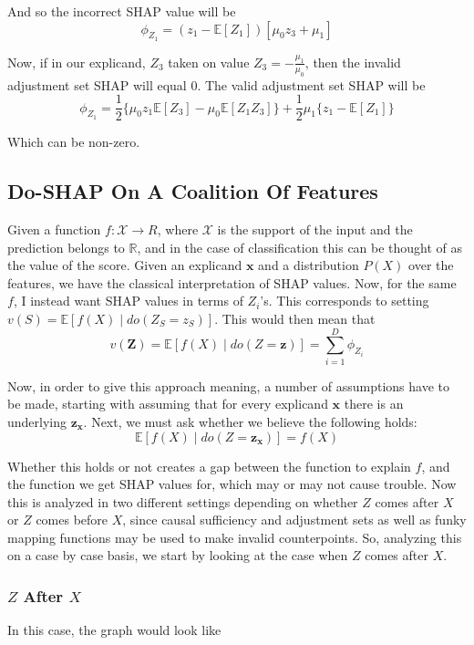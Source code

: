 \documentclass{article}
\begin{document}
And so the incorrect SHAP value will be
\[
\phi_{Z_1} = (z_1 - \mathbb{E}[Z_1])[\mu_0z_3 + \mu_1] 
\]

Now, if in our explicand, $Z_3$ taken on value $Z_3 = -\frac{\mu_1}{\mu_0}$, then the invalid adjustment set SHAP will equal $0$. The valid adjustment set SHAP will be
\[
\phi_{Z_1} = \frac{1}{2}\Big\{\mu_0z_1\mathbb{E}[Z_3] - \mu_0\mathbb{E}[Z_1Z_3] \Big\} + \frac{1}{2}\mu_1\{z_1 - \mathbb{E}[Z_1] \}
\]

Which can be non-zero.

\subsection{Do-SHAP On A Coalition Of Features}
Given a function $f: \mathcal{X} \rightarrow R$, where $\mathcal{X}$ is the support of the input and the prediction belongs to $\mathbb{R}$, and in the case of classification this can be thought of as the value of the score. Given an explicand $\mathbf{x}$ and a distribution $P(X)$ over the features, we have the classical interpretation of SHAP values. Now, for the same $f$, I instead want SHAP values in terms of $Z_i$'s. This corresponds to setting $v(S) = \mathbb{E}[f(X) \mid do(Z_S = z_S)]$. This would then mean that
\[
v(\mathbf{Z}) = \mathbb{E}[f(X) \mid do(Z = \mathbf{z})] = \sum_{i = 1}^D \phi_{Z_i}
\]

Now, in order to give this approach meaning, a number of assumptions have to be made, starting with assuming that for every explicand $\mathbf{x}$ there is an underlying $\mathbf{z}_{\mathbf{x}}$. Next, we must ask whether we believe the following holds:
\[
\mathbb{E}[f(X) \mid do(Z = \mathbf{z}_{\mathbf{x}})] = f(X)
\]

Whether this holds or not creates a gap between the function to explain $f$, and the function we get SHAP values for, which may or may not cause trouble. Now this is analyzed in two different settings depending on whether $Z$ comes after $X$ or $Z$ comes before $X$, since causal sufficiency and adjustment sets as well as funky mapping functions may be used to make invalid counterpoints. So, analyzing this on a case by case basis, we start by looking at the case when $Z$ comes after $X$.


\subsubsection{$Z$ After $X$}

In this case, the graph would look like
\end{document}
